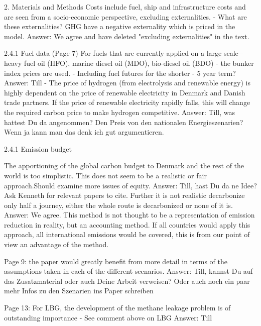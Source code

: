 2. Materials and Methods
Costs include fuel, ship and infrastructure costs and are seen from a socio-economic perspective, excluding externalities. 
-       What are these externalities? GHG have a negative externality which is priced in the model.
Answer: We agree and have deleted "excluding externalities" in the text.

2.4.1 Fuel data (Page 7)
For fuels that are currently applied on a large scale - heavy fuel oil (HFO), marine diesel oil (MDO), bio-diesel oil (BDO) - the bunker index prices are used.
-	Including fuel futures for the shorter - 5 year term?
Answer: Till
-	The price of hydrogen (from electrolysis and renewable energy) is highly dependent on the price of renewable electricity in Denmark and Danish trade partners. If the price of renewable electricity rapidly falls, this will change the required carbon price to make hydrogen competitive.
Answer: Till, was hattest Du da angenommen? Den Preis von den nationalen Energieszenarien? Wenn ja kann man das denk ich gut argumentieren.

2.4.1 Emission budget

The apportioning of the global carbon budget to Denmark and the rest of the world is too simplistic. This does not seem to be a realistic or fair approach.Should examine more issues of equity. 
Answer: Till, hast Du da ne Idee? Ask Kenneth for relevant papers to cite.
Further it is not realistic decarbonize only half a journey, either the whole route is decarbonized or none of it is.
Answer: We agree. This method is not thought to be a representation of emission reduction in reality, but an accounting method. If all countries would apply this approach, all international emissions would be covered, this is from our point of view an advantage of the method.

Page 9: the paper would greatly benefit from more detail in terms of the assumptions taken in each of the different scenarios.
Answer: Till, kannst Du auf das Zusatzmaterial oder auch Deine Arbeit verweisen? Oder auch noch ein paar mehr Infos zu den Szenarien ins Paper schreiben

Page 13: For LBG, the development of the methane leakage problem is of outstanding importance
-	See comment above on LBG
Answer: Till

